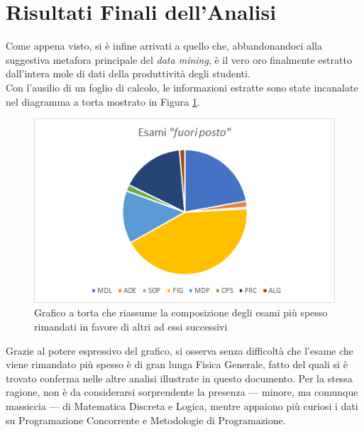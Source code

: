 \section{Risultati Finali dell'Analisi}

    Come appena visto, si è infine arrivati a quello che, abbandonandoci alla suggestiva metafora principale del \textit{data mining}, è il vero oro finalmente estratto dall'intera mole di dati della produttività degli studenti. \\

    Con l'ausilio di un foglio di calcolo, le informazioni estratte sono state incanalate nel diagramma a torta mostrato in Figura \ref{fine}. \\

      \begin{figure}
        \centering
        \caption{Grafico a torta che riassume la composizione degli esami più spesso rimandati in favore di altri ad essi successivi}
        \label{fine}
        \includegraphics[scale=0.85]{../seq/out_of_place.png}
    \end{figure}

    Grazie al potere espressivo del grafico, si osserva senza difficoltà che l'esame che viene rimandato più spesso è di gran lunga Fisica Generale, fatto del quali si è trovato conferma nelle altre analisi illustrate in questo documento. Per la stessa ragione, non è da considerarsi sorprendente la presenza --- minore, ma comunque massiccia --- di Matematica Discreta e Logica, mentre appaiono più curiosi i dati su Programazione Concorrente e Metodologie di Programazione.